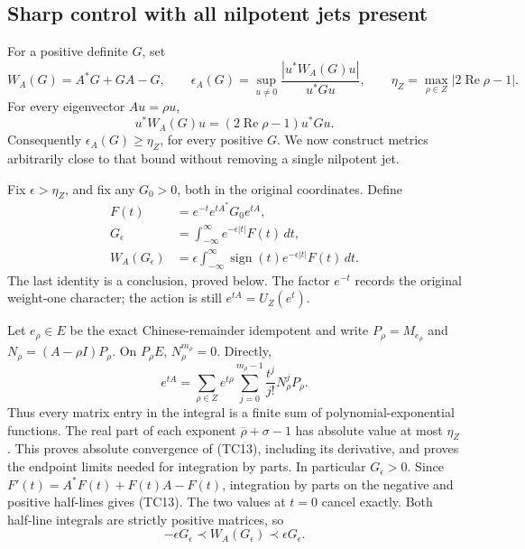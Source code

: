 \subsection{Sharp control with all nilpotent jets present}

For a positive definite \(G\), set
\[
 W_A(G)=A^*G+GA-G,\qquad
 \epsilon_A(G)=\sup_{u\ne0}
       \frac{|u^*W_A(G)u|}{u^*Gu},\qquad
 \eta_Z=\max_{\rho\in Z}|2\operatorname{Re}\rho-1|.
 \tag{TC11}
\]
For every eigenvector \(Au=\rho u\),
\[
 u^*W_A(G)u=(2\operatorname{Re}\rho-1)u^*Gu.
 \tag{TC12}
\]
Consequently \(\epsilon_A(G)\geq\eta_Z\), for every positive \(G\).
We now construct metrics arbitrarily close to that bound without
removing a single nilpotent jet.

Fix \(\epsilon>\eta_Z\), and fix any \(G_0>0\), both in the original
coordinates.  Define
\[
 \begin{split}
 F(t)&=e^{-t}e^{tA^*}G_0e^{tA},\\
 G_\epsilon&=\int_{-\infty}^{\infty}
                      e^{-\epsilon|t|}F(t)\,dt,\\
 W_A(G_\epsilon)&=\epsilon\int_{-\infty}^{\infty}
               \operatorname{sign}(t)e^{-\epsilon|t|}F(t)\,dt .
 \end{split}
 \tag{TC13}
\]
The last identity is a conclusion, proved below.
The factor \(e^{-t}\) records the original weight-one character;
the action is still \(e^{tA}=U_Z(e^t)\).

Let \(e_\rho\in E\) be the exact Chinese-remainder idempotent and
write \(P_\rho=M_{e_\rho}\) and
\(N_\rho=(A-\rho I)P_\rho\).
On \(P_\rho E\), \(N_\rho^{m_\rho}=0\).  Directly,
\[
 e^{tA}
  =\sum_{\rho\in Z}e^{t\rho}
        \sum_{j=0}^{m_\rho-1}\frac{t^j}{j!}N_\rho^jP_\rho.
 \tag{TC14}
\]
Thus every matrix entry in the integral is a finite sum of
polynomial-exponential functions.  The real part of each exponent
\(\overline\rho+\sigma-1\) has absolute value at most \(\eta_Z\).
This proves absolute convergence of (TC13), including its derivative,
and proves the endpoint limits needed for integration by parts.
In particular \(G_\epsilon>0\).  Since
\(F'(t)=A^*F(t)+F(t)A-F(t)\), integration by parts on the negative
and positive half-lines gives (TC13).  The two values at \(t=0\)
cancel exactly.  Both half-line integrals are strictly positive
matrices, so
\[
 -\epsilon G_\epsilon\prec W_A(G_\epsilon)
                     \prec\epsilon G_\epsilon.
 \tag{TC15}
\]


